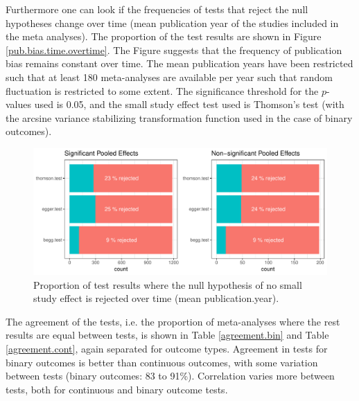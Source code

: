 \documentclass[11pt,a4paper,twoside]{book}\usepackage[]{graphicx}\usepackage[]{color}
\newenvironment{knitrout}{}{} %
\begin{document}
Furthermore one can look if the frequencies of tests that reject the null hypotheses change over time (mean publication year of the studies included in the meta analyses). The proportion of the test results are shown in Figure \ref{pub.bias.time.overtime}. The Figure suggests that the frequency of publication bias remains constant over time. The mean publication years have been restricted such that at least 180 meta-analyses are available per year such that random fluctuation is restricted to some extent. The significance threshold for the $p$-values used is 0.05, and the small study effect test used is Thomson's test (with the arcsine variance stabilizing transformation function used in the case of binary outcomes).

\begin{figure}
\begin{knitrout}
\color{fgcolor}

{\centering \includegraphics[width=\textwidth-3cm]{figure/ch02_figunnamed-chunk-24-1} 

}



\end{knitrout}
\caption{Proportion of test results where the null hypothesis of no small study effect is rejected over time (mean publication.year).}
\label{pub.bias.overtime}
\end{figure}


The agreement of the tests, i.e. the proportion of meta-analyses where the rest results are equal between tests, is shown in Table \ref{agreement.bin} and Table \ref{agreement.cont}, again separated for outcome types. Agreement in tests for binary outcomes is better than continuous outcomes, with some variation between tests (binary outcomes: 83 to 91\%). Correlation varies more between tests, both for continuous and binary outcome tests.
\end{document}
